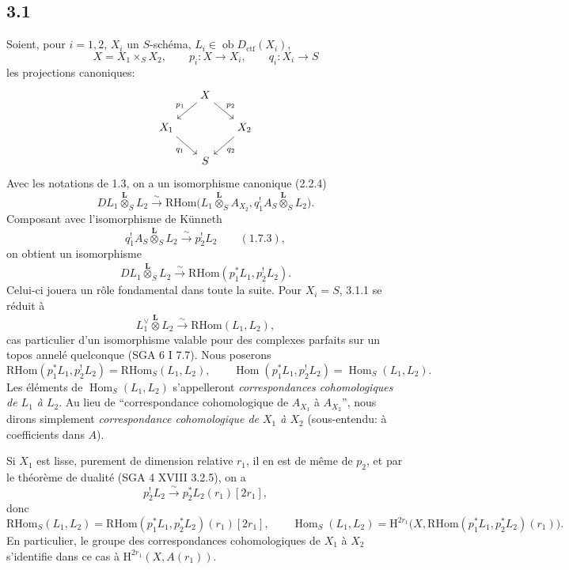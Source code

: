 \documentclass[11pt]{article}
\renewcommand{\H}{\mathrm{H}}
\DeclareMathOperator{\Hom}{Hom}
\newcommand{\ob}{\operatorname{ob}}
\providecommand{\RHom}{\mathrm{RHom}}
\providecommand{\Dctf}{D_{\mathrm{ctf}}}
\providecommand{\Dctf}{D_{\mathrm{ctf}}}
\providecommand{\RHom}{\mathrm{RHom}}
\providecommand{\Hom}{\operatorname{Hom}}
\providecommand{\ob}{\operatorname{ob}}
\providecommand{\RHom}{\mathrm R\mathcal{H}om}
\providecommand{\RHom}{\mathrm{RHom}}
\providecommand{\Hom}{\operatorname{Hom}}
\begin{document}
\subsection*{3.1}
Soient, pour $i=1,2$, $X_i$ un $S$-schéma, $L_i\in\ob\Dctf(X_i)$,
\[
X=X_1\times_S X_2,
\qquad
p_i:X\longrightarrow X_i,
\qquad
q_i:X_i\longrightarrow S
\]
les projections canoniques:
\[
\begin{tikzcd}[column sep=1.6em,row sep=1.5em]
& X \arrow[dl,"p_1"'] \arrow[dr,"p_2"] & \\
X_1 \arrow[dr,"q_1"'] & & X_2 \arrow[dl,"q_2"] \\
& S &
\end{tikzcd}
\]
Avec les notations de 1.3, on a un isomorphisme canonique (2.2.4)
\[
DL_1\overset{\mathbf L}{\otimes}_S L_2
\xrightarrow{\sim}
\RHom\bigl(L_1\overset{\mathbf L}{\otimes}_S A_{X_2},
q_1^!A_S\overset{\mathbf L}{\otimes}_S L_2\bigr).
\]
Composant avec l'isomorphisme de Künneth
\[
q_1^!A_S\overset{\mathbf L}{\otimes}_S L_2
\xrightarrow{\sim}p_2^!L_2 \qquad (1.7.3),
\]
on obtient un isomorphisme
\begin{equation}
DL_1\overset{\mathbf L}{\otimes}_S L_2
\xrightarrow{\sim}
\RHom(p_1^*L_1,p_2^!L_2).
\tag{3.1.1}
\end{equation}
Celui-ci jouera un rôle fondamental dans toute la suite. Pour $X_i=S$, 3.1.1 se réduit à
\[
L_1^\vee\overset{\mathbf L}{\otimes}L_2\xrightarrow{\sim}\RHom(L_1,L_2),
\]
cas particulier d'un isomorphisme valable pour des complexes parfaits sur un topos annelé quelconque (SGA 6 I 7.7). Nous poserons
\begin{equation}
\RHom(p_1^*L_1,p_2^!L_2)=\RHom_S(L_1,L_2),
\qquad
\Hom(p_1^*L_1,p_2^!L_2)=\Hom_S(L_1,L_2).
\tag{3.1.2}
\end{equation}
Les éléments de $\Hom_S(L_1,L_2)$ s'appelleront \emph{correspondances cohomologiques de $L_1$ à $L_2$}. Au lieu de ``correspondance cohomologique de $A_{X_1}$ à $A_{X_2}$'', nous dirons simplement \emph{correspondance cohomologique de $X_1$ à $X_2$} (sous-entendu: à coefficients dans $A$).

Si $X_1$ est lisse, purement de dimension relative $r_1$, il en est de même de $p_2$, et par le théorème de dualité (SGA 4 XVIII 3.2.5), on a
\[
p_2^!L_2\xrightarrow{\sim}p_2^*L_2(r_1)[2r_1],
\]
donc
\begin{equation}
\RHom_S(L_1,L_2)=\RHom(p_1^*L_1,p_2^*L_2)(r_1)[2r_1],
\qquad
\Hom_S(L_1,L_2)=\H^{2r_1}\bigl(X,\RHom(p_1^*L_1,p_2^*L_2)(r_1)\bigr).
\tag{3.1.3}
\end{equation}
En particulier, le groupe des correspondances cohomologiques de $X_1$ à $X_2$ s'identifie dans ce cas à $\H^{2r_1}(X,A(r_1))$.
\end{document}

